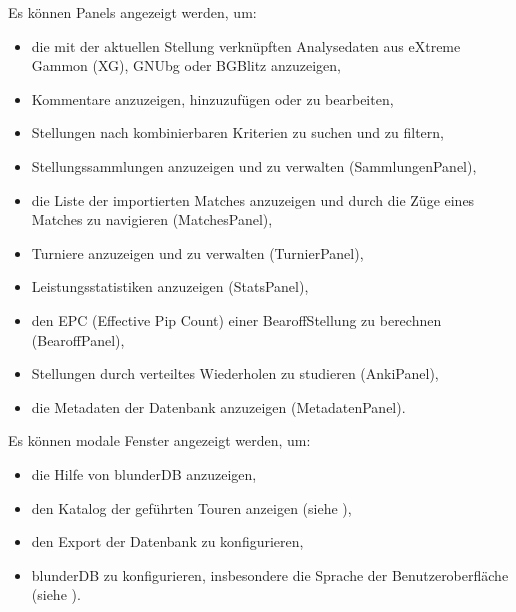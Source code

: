 \documentclass[letterpaper,10pt,german]{sphinxmanual}
\begin{document}
\sphinxAtStartPar
Es können Panels angezeigt werden, um:
\begin{itemize}
\item {} 
\sphinxAtStartPar
die mit der aktuellen Stellung verknüpften Analysedaten aus eXtreme Gammon (XG), GNUbg oder BGBlitz anzuzeigen,

\item {} 
\sphinxAtStartPar
Kommentare anzuzeigen, hinzuzufügen oder zu bearbeiten,

\item {} 
\sphinxAtStartPar
Stellungen nach kombinierbaren Kriterien zu suchen und zu filtern,

\item {} 
\sphinxAtStartPar
Stellungssammlungen anzuzeigen und zu verwalten (Sammlungen\sphinxhyphen{}Panel),

\item {} 
\sphinxAtStartPar
die Liste der importierten Matches anzuzeigen und durch die Züge eines Matches zu navigieren (Matches\sphinxhyphen{}Panel),

\item {} 
\sphinxAtStartPar
Turniere anzuzeigen und zu verwalten (Turnier\sphinxhyphen{}Panel),

\item {} 
\sphinxAtStartPar
Leistungsstatistiken anzuzeigen (Stats\sphinxhyphen{}Panel),

\item {} 
\sphinxAtStartPar
den EPC (Effective Pip Count) einer Bearoff\sphinxhyphen{}Stellung zu berechnen (Bearoff\sphinxhyphen{}Panel),

\item {} 
\sphinxAtStartPar
Stellungen durch verteiltes Wiederholen zu studieren (Anki\sphinxhyphen{}Panel),

\item {} 
\sphinxAtStartPar
die Metadaten der Datenbank anzuzeigen (Metadaten\sphinxhyphen{}Panel).

\end{itemize}

\sphinxAtStartPar
Es können modale Fenster angezeigt werden, um:
\begin{itemize}
\item {} 
\sphinxAtStartPar
die Hilfe von blunderDB anzuzeigen,

\item {} 
\sphinxAtStartPar
den Katalog der geführten Touren anzeigen (siehe {\hyperref[\detokenize{manuel:visites-guidees}]{}}),

\item {} 
\sphinxAtStartPar
den Export der Datenbank zu konfigurieren,

\item {} 
\sphinxAtStartPar
blunderDB zu konfigurieren, insbesondere die Sprache der Benutzeroberfläche (siehe {\hyperref[\detokenize{manuel:configuration}]{}}).

\end{itemize}
\end{document}
